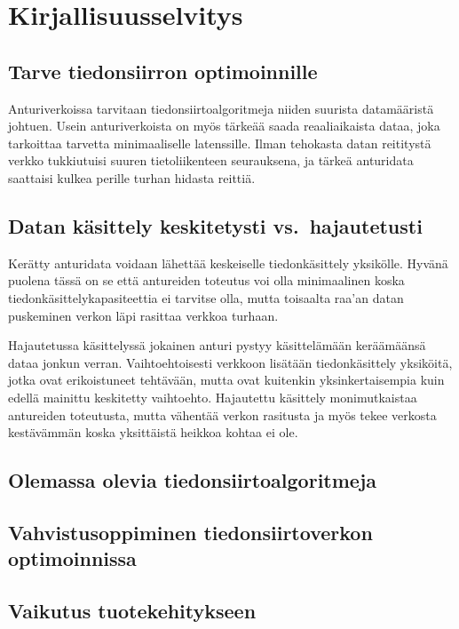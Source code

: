 \section{Kirjallisuusselvitys}

\subsection{Tarve tiedonsiirron optimoinnille}
Anturiverkoissa tarvitaan tiedonsiirtoalgoritmeja niiden suurista datamääristä
johtuen. Usein anturiverkoista on myös tärkeää saada reaaliaikaista dataa, joka
tarkoittaa tarvetta minimaaliselle latenssille. Ilman tehokasta datan
reititystä verkko tukkiutuisi suuren tietoliikenteen seurauksena, ja tärkeä
anturidata saattaisi kulkea perille turhan hidasta reittiä. 

\subsection{Datan käsittely keskitetysti vs.\ hajautetusti}
Kerätty anturidata voidaan lähettää keskeiselle tiedonkäsittely yksikölle.
Hyvänä puolena tässä on se että antureiden toteutus voi olla minimaalinen koska
tiedonkäsittelykapasiteettia ei tarvitse olla, mutta toisaalta raa'an datan
puskeminen verkon läpi rasittaa verkkoa turhaan.

Hajautetussa käsittelyssä jokainen anturi pystyy käsittelämään keräämäänsä
dataa jonkun verran. Vaihtoehtoisesti verkkoon lisätään tiedonkäsittely
yksiköitä, jotka ovat erikoistuneet tehtävään, mutta ovat kuitenkin
yksinkertaisempia kuin edellä mainittu keskitetty vaihtoehto. Hajautettu
käsittely monimutkaistaa antureiden toteutusta, mutta vähentää verkon rasitusta
ja myös tekee verkosta kestävämmän koska yksittäistä heikkoa kohtaa ei ole.

\subsection{Olemassa olevia tiedonsiirtoalgoritmeja}

\subsection{Vahvistusoppiminen tiedonsiirtoverkon optimoinnissa}

\subsection{Vaikutus tuotekehitykseen}
